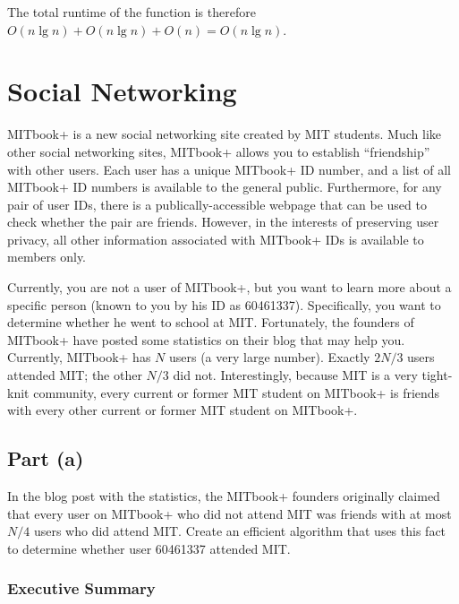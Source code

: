 \documentclass{6046}
\begin{document}
The total runtime of the function is therefore $O(n \lg n) + O(n \lg n ) + O(n) = O(n \lg n)$. 

\newpage

\section{Social Networking}

{\em

MITbook+ is a new social networking site created by MIT students. Much like
other social networking sites, MITbook+ allows you to establish ``friendship''
with other users. Each user has a unique MITbook+ ID number, and a list of all
MITbook+ ID numbers is available to the general public.  Furthermore, for any
pair of user IDs, there is a publically-accessible webpage that can be used to
check whether the pair are friends.  However, in the interests of preserving
user privacy, all other information associated with MITbook+ IDs is available
to members only.

Currently, you are not a user of MITbook+, but you want to learn more about a
specific person (known to you by his ID as 60461337).  Specifically, you want
to determine whether he went to school at MIT.  Fortunately, the founders of
MITbook+ have posted some statistics on their blog that may help you.
Currently, MITbook+ has $N$ users (a very large number).  Exactly $2N / 3$
users attended MIT; the other $N / 3$ did not.  Interestingly, because MIT is a
very tight-knit community, every current or former MIT student on MITbook+ is
friends with every other current or former MIT student on MITbook+.

}

\subsection*{Part (a)}

{\em

In the blog post with the statistics, the MITbook+ founders originally claimed
that every user on MITbook+ who did not attend MIT was friends with at most
$N / 4$ users who did attend MIT.  Create an efficient algorithm that uses this
fact to determine whether user 60461337 attended MIT.

}

\subsubsection*{Executive Summary}
\end{document}
